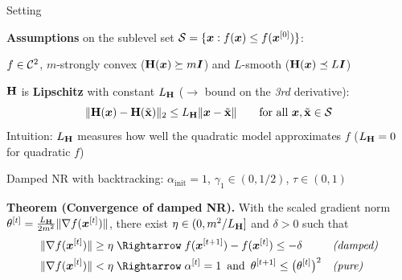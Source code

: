 \documentclass[11pt,compress,t,notes=noshow, xcolor=table]{beamer}
\newcommand{\LH}{L_{\H}}
\begin{document}
\begin{framei}[fs=small]{Setting}
\item \textbf{Assumptions} on the sublevel set $\mathcal{S} = \{\bm{x} : f(\bm{x}) \le f(\bm{x}^{[0]})\}$:
\begin{itemizeM}
\item $f \in \mathcal{C}^{2}$, $m$-strongly convex ($\mathbf{H}(\bm{x}) \succeq m \bm{I}$) and $L$-smooth ($\mathbf{H}(\bm{x}) \preceq L \bm{I}$)
\item $\mathbf{H}$ is \textbf{Lipschitz} with constant $\LH$ ($\rightarrow$ bound on the \textit{3rd} derivative):
$$\|\H(\xv) - \H(\xtil)\|_2 \le \LH \|\xv - \xtil\| \qquad \text{for all } \xv, \xtil \in \S$$
Intuition: $\LH$ measures how well the quadratic model approximates $f$ ($\LH = 0$ for quadratic $f$)
\end{itemizeM}
\item Damped NR with backtracking: $\alpha_{\text{init}} = 1$, $\gamma_1 \in (0, 1/2)$, $\tau \in (0, 1)$
\begin{framed}
\textbf{Theorem \textnormal{(Convergence of damped NR)}.}
With the scaled gradient norm $\theta^{[t]} = \frac{\LH}{2m^2}\|\nabla f(\xv^{[t]})\|$, there exist
$\eta \in (0, m^2/\LH]$ and $\delta > 0$ such that
\begin{align*}
\|\nabla f(\xv^{[t]})\| \ge \eta \; &\Rightarrow \; f(\xv^{[t+1]}) - f(\xv^{[t]}) \le - \delta
&& \textit{(damped)} \\
\|\nabla f(\xv^{[t]})\| < \eta \; &\Rightarrow \; \alpha^{[t]} = 1 \, \text{ and } \,
\theta^{[t+1]} \le \big( \theta^{[t]} \big)^2 && \textit{(pure)}
\end{align*}
\end{framed}
\end{framei}

\end{document}
